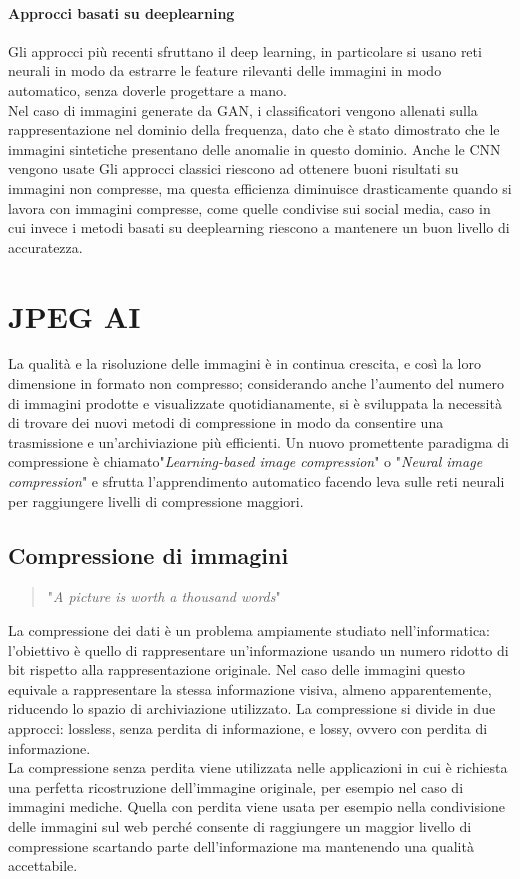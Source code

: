 \paragraph{Approcci basati su deeplearning} Gli approcci più recenti sfruttano il deep learning, in particolare si usano reti neurali in modo da estrarre le feature rilevanti delle immagini in modo automatico, senza doverle progettare a mano. \\
Nel caso di immagini generate da GAN, i classificatori vengono allenati sulla rappresentazione nel dominio della frequenza, dato che è stato dimostrato che le immagini sintetiche presentano delle anomalie in questo dominio. Anche le CNN vengono usate 
Gli approcci classici riescono ad ottenere buoni risultati su immagini non compresse, ma questa efficienza diminuisce drasticamente quando si lavora con immagini compresse, come quelle condivise sui social media, caso in cui invece i metodi basati su deeplearning riescono a mantenere un buon livello di accuratezza.\\
\newpage
\section{JPEG AI} \label{sec:jpegai}
La qualità e la risoluzione delle immagini  è in continua crescita, e così la loro dimensione in formato non compresso; considerando anche l'aumento del numero di immagini prodotte e visualizzate quotidianamente, si è sviluppata la necessità di trovare dei nuovi metodi di compressione in modo da consentire una trasmissione e un'archiviazione più efficienti.
Un nuovo promettente paradigma di compressione è chiamato"\textit{Learning-based image compression}" o "\textit{Neural image compression}" e sfrutta l'apprendimento automatico  facendo leva sulle reti neurali per raggiungere livelli di compressione maggiori.
\subsection{Compressione di immagini}
\begin{quote} 
    "\textit{A picture is worth a thousand words}"
\end{quote}
La compressione dei dati è un problema ampiamente studiato nell'informatica: l'obiettivo è quello di rappresentare un'informazione usando un numero ridotto di bit rispetto alla rappresentazione originale. Nel caso delle immagini questo equivale a rappresentare la stessa informazione visiva, almeno apparentemente, riducendo lo spazio di archiviazione utilizzato. La compressione si divide in due approcci: lossless,  senza perdita di informazione, e lossy, ovvero con perdita di informazione.\\
La compressione senza perdita viene utilizzata nelle applicazioni in cui è richiesta una perfetta ricostruzione dell'immagine originale, per esempio nel caso di immagini mediche. Quella con perdita viene usata per esempio nella condivisione delle immagini sul web perché consente di raggiungere un maggior livello di compressione scartando parte dell'informazione ma mantenendo una qualità accettabile.
